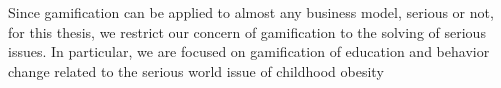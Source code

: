 Since gamification can be applied to almost any business model, serious or not,
for this thesis, we restrict our concern of gamification to the solving of serious issues. In
particular, we are focused on gamification of education and behavior change related to the
serious world issue of childhood obesity